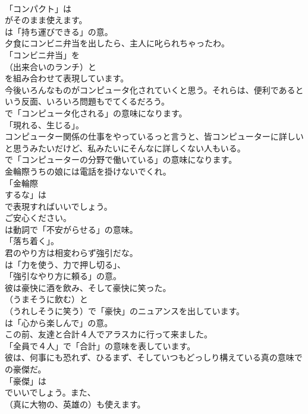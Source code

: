 \documentclass[8pt]{extreport}
\begin{document}
\begin{CJK}{UTF8}{min}
\\	「コンパクト」は
\\	がそのまま使えます。
\\	は「持ち運びできる」の意。	
\\	夕食にコンビニ弁当を出したら、主人に叱られちゃったわ。 
\\	「コンビニ弁当」を
\\	（出来合いのランチ）と
\\	を組み合わせて表現しています。	
\\	今後いろんなものがコンピュータ化されていくと思う。それらは、便利であるという反面、いろいろ問題もでてくるだろう。 
\\	で「コンピュータ化される」の意味になります。
\\	「現れる、生じる」。	
\\	コンピューター関係の仕事をやっているっと言うと、皆コンピューターに詳しいと思うみたいだけど、私みたいにそんなに詳しくない人もいる。 
\\	で「コンピューターの分野で働いている」の意味になります。	
\\	金輪際うちの娘には電話を掛けないでくれ。 
\\	「金輪際 
\\	するな」は
\\	で表現すればいいでしょう。	
\\	ご安心ください。 
\\	は動詞で「不安がらせる」の意味。
\\	「落ち着く」。	
\\	君のやり方は相変わらず強引だな。 
\\	は「力を使う、力で押し切る」、
\\	「強引なやり方に頼る」の意。	
\\	彼は豪快に酒を飲み、そして豪快に笑った。 
\\	（うまそうに飲む）と 
\\	（うれしそうに笑う）で「豪快」のニュアンスを出しています。
\\	は「心から楽しんで」の意。	
\\	この前、友達と合計４人でアラスカに行って来ました。 
\\	「全員で４人」で「合計」の意味を表しています。	
\\	彼は、何事にも恐れず、ひるまず、そしていつもどっしり構えている真の意味での豪傑だ。 
\\	「豪傑」は 
\\	でいいでしょう。また、
\\	（真に大物の、英雄の）も使えます。

\end{CJK}
\end{document}
